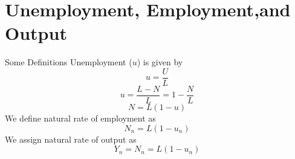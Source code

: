 \documentclass[shownotes,11pt, aspectratio=169]{beamer}
\begin{document}
\begin{frame}
\end{frame}

\section{Unemployment, Employment,and Output}
\begin{frame}{Some Definitions}
Unemployment ($u$) is given by
\[ u = \frac{U}{L} \]
\pause
\[ u = \frac{L - N}{L} = 1 - \frac{N}{L} \]
\pause
\[ N = L(1 - u) \]
We define natural rate of employment as 
\[ N_n = L(1 - u_n) \]
\pause
We assign natural rate of output as
\[ Y_n = N_n = L(1 - u_n) \]

\end{frame}
\end{document}
